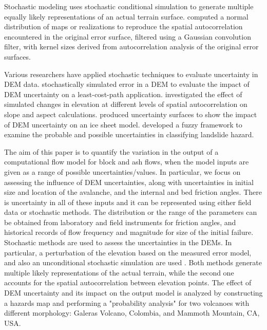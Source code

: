 \documentclass{article}
\begin{document}
Stochastic modeling uses stochastic conditional simulation to generate
multiple equally likely representations of an actual terrain
surface. \citet{Hunter_Goodchild_1997, Ehlschlaeger_1996} computed a
normal distribution of maps or realizations to reproduce the spatial
autocorrelation encountered in the original error surface, filtered
using a Gaussian convolution filter, with kernel sizes derived from
autocorrelation analysis of the original error surfaces.

Various researchers have applied stochastic techniques to evaluate
uncertainty in DEM data. \citet{Ehlschlaeger_1996} stochastically
simulated error in a DEM to evaluate the impact of DEM uncertainty on
a least-cost-path application. \citet{Hunter_Goodchild_1997}
investigated the effect of simulated changes in elevation at different
levels of spatial autocorrelation on slope and aspect
calculations. \citet{Felix_Hebeler} produced uncertainty surfaces to
show the impact of DEM uncertainty on an ice sheet
model. \citet{Amii_Darnell} developed a fuzzy framework to examine the
probable and possible uncertainties in classifying landslide hazard.

The aim of this paper is to quantify the variation in the output of a
computational flow model for block and ash flows, when the model
inputs are given as a range of possible uncertainties/values.  In
particular, we focus on assessing the influence of DEM uncertainties,
along with uncertainties in initial size and location of the
avalanche, and the internal and bed friction angles. There is
uncertainty in all of these inputs and it can be represented using
either field data or stochastic methods.  The distribution or the
range of the parameters can be obtained from laboratory and field
instruments for friction angles, and historical records of flow
frequency and magnitude for size of the initial failure.  Stochastic
methods are used to assess the uncertainties in the DEMs.  In
particular, a perturbation of the elevation based on the measured
error model, and also an unconditional stochastic simulation are used
\citep{Ehlschlaeger_1996}.  Both methods generate multiple likely
representations of the actual terrain, while the second one accounts
for the spatial autocorrelation between elevation points.  The effect
of DEM uncertainty and its impact on the output model is analyzed by
constructing a hazards map and performing a "probability analysis" for
two volcanoes with different morphology: Galeras Volcano, Colombia,
and Mammoth Mountain, CA, USA.
\end{document}
